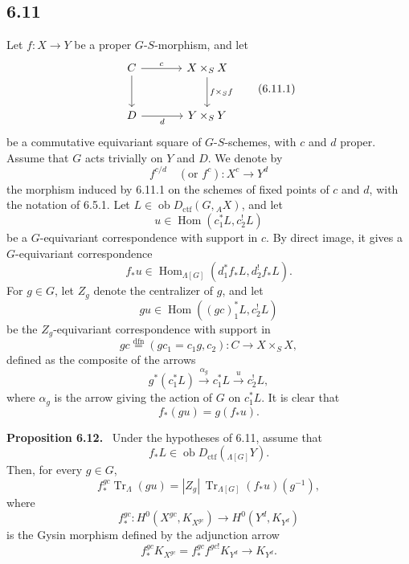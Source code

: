 \documentclass[11pt]{article}
\newenvironment{statement}[1]{\par\medskip\noindent\textbf{#1.}\ }{\par\medskip}
\DeclareMathOperator{\Hom}{Hom}
\providecommand{\Tr}{\operatorname{Tr}}
\providecommand{\Tr}{\operatorname{Tr}}
\providecommand{\Ob}{\operatorname{ob}}
\providecommand{\Tr}{\operatorname{Tr}}
\providecommand{\Hom}{\operatorname{Hom}}
\providecommand{\Ob}{\operatorname{ob}}
\providecommand{\Tr}{\operatorname{Tr}}
\providecommand{\Ob}{\operatorname{Ob}}
\begin{document}
\subsection*{6.11}
Let $f:X\to Y$ be a proper $G$-$S$-morphism, and let
\begin{equation}
\begin{tikzcd}[column sep=large,row sep=large]
C \arrow[r,"c"] \arrow[d] & X\times_SX \arrow[d,"f\times_Sf"]\\
D \arrow[r,"d"'] & Y\times_SY
\end{tikzcd}
\tag{6.11.1}
\end{equation}
be a commutative equivariant square of $G$-$S$-schemes, with $c$ and $d$ proper. Assume that $G$ acts trivially on $Y$ and $D$. We denote by
\begin{equation}
f^{c/d}\quad(\text{or } f^c):X^c\longrightarrow Y^d
\tag{6.11.2}
\end{equation}
the morphism induced by 6.11.1 on the schemes of fixed points of $c$ and $d$, with the notation of 6.5.1. Let $L\in\Ob D_{\mathrm{ctf}}(G,{}_AX)$, and let
\[
u\in\Hom(c_1^*L,c_2^!L)
\]
be a $G$-equivariant correspondence with support in $c$. By direct image, it gives a $G$-equivariant correspondence
\[
f_*u\in\Hom_{\Lambda[G]}(d_1^*f_*L,d_2^!f_*L).
\]
For $g\in G$, let $Z_g$ denote the centralizer of $g$, and let
\begin{equation}
gu\in\Hom((gc)_1^*L,c_2^!L)
\tag{6.11.3}
\end{equation}
be the $Z_g$-equivariant correspondence with support in
\begin{equation}
gc\stackrel{\mathrm{dfn}}{=}(gc_1=c_1g,c_2):C\to X\times_SX,
\tag{6.11.4}
\end{equation}
defined as the composite of the arrows
\[
g^*(c_1^*L)\xrightarrow{\alpha_g}c_1^*L\xrightarrow{u}c_2^!L,
\]
where $\alpha_g$ is the arrow giving the action of $G$ on $c_1^*L$. It is clear that
\begin{equation}
f_*(gu)=g(f_*u).
\tag{6.11.5}
\end{equation}

\begin{statement}{Proposition 6.12}
Under the hypotheses of 6.11, assume that
\[
f_*L\in\Ob D_{\mathrm{ctf}}({}_{\Lambda[G]}Y).
\]
Then, for every $g\in G$,
\begin{equation}
f_*^{gc}\Tr_{\Lambda}(gu)
=
|Z_g|\,\Tr_{\Lambda[G]}(f_*u)(g^{-1}),
\tag{6.12.1}
\end{equation}
where
\[
f_*^{gc}:H^0(X^{gc},K_{X^{gc}})\longrightarrow H^0(Y^d,K_{Y^d})
\]
is the Gysin morphism defined by the adjunction arrow
\[
f_*^{gc}K_{X^{gc}}=f_*^{gc}f^{gc!}K_{Y^d}\longrightarrow K_{Y^d}.
\]
\end{statement}
\end{document}
